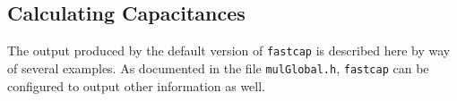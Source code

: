 %
%
%
%
%
%

\subsection{Calculating Capacitances}

The output produced by the default version of {\tt fastcap} is described
here by way of several examples. As documented in the file {\tt mulGlobal.h},
{\tt fastcap} can be configured to output other information as well.

